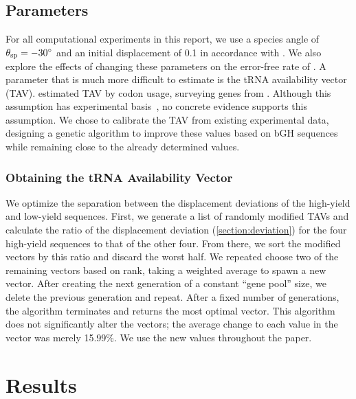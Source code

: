 \documentclass{article}
\begin{document}
\subsection{Parameters}
\label{section:parameters}
For all computational experiments in this report, we use a species
angle of $\theta_{\rm{sp}} = -30^\circ$ and an initial displacement of 0.1
in accordance with \citet{lalit:mechanics}.
We also explore the effects of changing these parameters on the
error-free rate of \prfB.
A parameter that is much more difficult to estimate
is the tRNA availability vector (TAV).
\citeauthor{lalit:mechanics} estimated TAV by codon usage, 
surveying genes from \ecoli.
Although this assumption has experimental basis~\cite{ikemura}, 
no concrete evidence supports this assumption.
We chose to calibrate the TAV from existing experimental data, 
designing a genetic algorithm to improve these values based on 
bGH sequences while remaining close 
to the already determined values.

\subsubsection{Obtaining the tRNA Availability Vector}
We optimize the separation between the displacement deviations of the 
high-yield and low-yield sequences. First, we generate a list of 
randomly modified TAVs and calculate the ratio of the 
displacement deviation (\autoref{section:deviation}) for the four 
high-yield sequences to that of the other four. From there, we sort the 
modified vectors by this ratio and discard the worst half.
We repeated choose two of the remaining vectors based on rank, taking a weighted 
average to spawn a new vector.  After creating the 
next generation of a constant ``gene pool'' size, we delete 
the previous generation and repeat. After a fixed number of 
generations, the algorithm terminates and returns the most optimal vector.
This algorithm does not significantly alter the vectors; the average 
change to each value in the vector was merely 15.99\%. We use the new values
throughout the paper.

\section{Results}
\subsection{\prfB}
\end{document}

